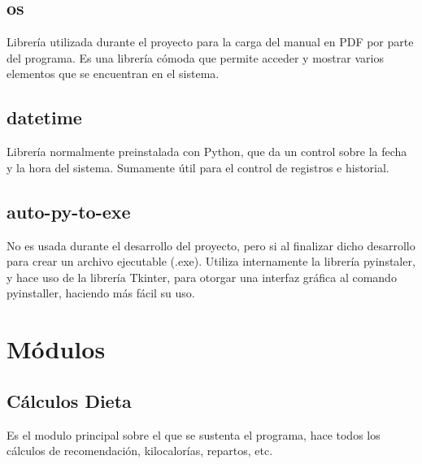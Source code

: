 \subsection{os}
Librería utilizada durante el proyecto para la carga del manual en PDF por parte del programa. Es una librería cómoda que permite acceder y mostrar varios elementos que se encuentran en el sistema.
\subsection{datetime}
Librería normalmente preinstalada con Python, que da un control sobre la fecha y la hora del sistema. Sumamente útil para el control de registros  e historial.

\subsection{auto-py-to-exe}
No es usada durante el desarrollo del proyecto, pero si al finalizar dicho desarrollo para crear un archivo ejecutable (.exe). Utiliza internamente la librería pyinstaler, y hace uso de la librería Tkinter, para otorgar una interfaz gráfica al comando pyinstaller, haciendo más fácil su uso.

\section{Módulos}
\subsection{Cálculos Dieta}
Es el modulo principal sobre el que se sustenta el programa, hace todos los cálculos de recomendación, kilocalorías, repartos, etc.\\

